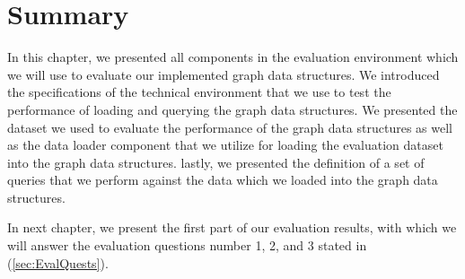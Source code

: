 {\section{Summary}
\label{sec:Eval4-summary}

In this chapter, we presented all components in the evaluation environment which we will use to evaluate our implemented graph data structures. We introduced the specifications of the technical environment that we use to test the performance of loading and querying the graph data structures. We presented the dataset we used to evaluate the performance of the graph data structures as well as the data loader component that we utilize for loading the evaluation dataset into the graph data structures. lastly, we presented the definition of a set of queries that we perform against the data which we loaded into the graph data structures.

In next chapter, we present the first part of our evaluation results, with which we will answer the evaluation questions number 1, 2, and 3 stated in (\ref{sec:EvalQuests}).


}